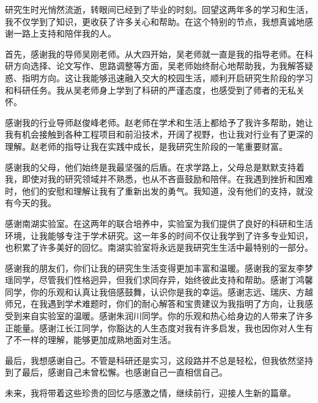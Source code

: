 
\begin{acknowledgements}
 
  研究生时光悄然流逝，转眼间已经到了毕业的时刻。回望这两年多的学习和生活，我不仅学到了知识，更收获了许多关心和帮助。在这个特别的节点，我想真诚地感谢一路上支持和陪伴我的人。
  
  首先，感谢我的导师吴刚老师。从大四开始，吴老师就一直是我的指导老师。在科研方向选择、论文写作、思路调整等方面，吴老师始终耐心地帮助我，为我解答疑惑、指明方向。这让我能够迅速融入交大的校园生活，顺利开启研究生阶段的学习和科研任务。我从吴老师身上学到了科研的严谨态度，也感受到了师者的无私关怀。
  
  感谢我的行业导师赵俊峰老师。赵老师在学术和生活上都给予了我许多帮助，她让我有机会接触到各种工程项目和前沿技术，开阔了视野，也让我对行业有了更深的理解。赵老师的指导让我在实践中成长，是我研究生阶段的一笔重要财富。
  
  感谢我的父母，他们始终是我最坚强的后盾。在求学路上，父母总是默默支持着我，即使对我的研究领域并不熟悉，也从不吝啬鼓励和陪伴。在我遇到挫折和困难时，他们的安慰和理解让我有了重新出发的勇气。我知道，没有他们的支持，就没有今天的我。
  
  感谢南湖实验室。在这两年的联合培养中，实验室为我们提供了良好的科研和生活环境，让我能够专注于学术研究。这一年多的时间不仅让我学到了许多专业知识，也积累了许多美好的回忆。南湖实验室将永远是我研究生生活中最特别的一部分。
  
  感谢我的朋友们，你们让我的研究生生活变得更加丰富和温暖。感谢我的室友李梦瑶同学，尽管我们性格迥异，但我们求同存异，始终彼此支持和帮助。感谢丁鸿馨同学，你的乐观和认真让我倍感鼓舞，认识你是我的幸运。感谢志远、瑞庆、方越师兄，在我遇到学术难题时，你们的耐心解答和宝贵建议为我指明了方向，让我感受到来自实验室的温暖。感谢朱润川同学。你的乐观和热心给身边的人带来了许多正能量。感谢江长江同学，你豁达的人生态度对我有许多启发，我也因你对人生有了不一样的理解，能够更加成熟地面对生活。
  
  最后，我想感谢自己。不管是科研还是实习，这段路并不总是轻松，但我依然坚持到了最后，感谢自己未曾松懈。也感谢自己一直相信自己。
  
  未来，我将带着这些珍贵的回忆与感激之情，继续前行，迎接人生新的篇章。

\end{acknowledgements}
